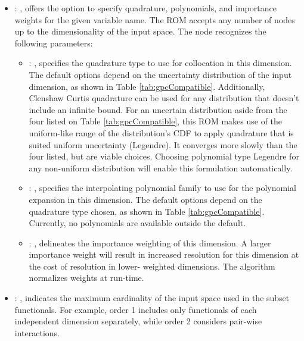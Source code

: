\begin{itemize}
    \item {}: ,
      offers the option to specify quadrature, polynomials, and importance weights for the given
      variable name.  The ROM accepts any number of  nodes up to the
      dimensionality of the input space.
      The  node recognizes the following parameters:
        \begin{itemize}
          \item {}: ,
            specifies the quadrature type to use for collocation in this dimension.  The default
            options                   depend on the uncertainty distribution of the input dimension,
            as shown in Table                   \ref{tab:gpcCompatible}. Additionally, Clenshaw
            Curtis quadrature can be used for any                   distribution that doesn't
            include an infinite bound.                                      \nb For an uncertain distribution aside from
            the four listed on Table                   \ref{tab:gpcCompatible}, this ROM
            makes use of the uniform-like range of the distribution's CDF to apply quadrature that
            is                   suited uniform uncertainty (Legendre).  It converges more slowly
            than the four listed, but are                   viable choices.  Choosing polynomial
            type Legendre for any non-uniform distribution will                   enable this
            formulation automatically.
          \item {}: ,
            specifies the interpolating polynomial family to use for the polynomial expansion in
            this                   dimension.  The default options depend on the quadrature type
            chosen, as shown in Table                   \ref{tab:gpcCompatible}.  Currently, no
            polynomials are available outside the                   default. 
          \item {}: ,
            delineates the importance weighting of this dimension.  A larger importance weight will
            result in increased resolution for this dimension at the cost of resolution in lower-
            weighted                   dimensions.  The algorithm normalizes weights at run-time. 
      \end{itemize}

    \item {}: ,
      indicates the maximum cardinality of the input space used in the subset functionals.  For
      example, order 1                                                  includes only functionals of
      each independent dimension separately, while order 2 considers pair-wise interactions.
  \end{itemize}

